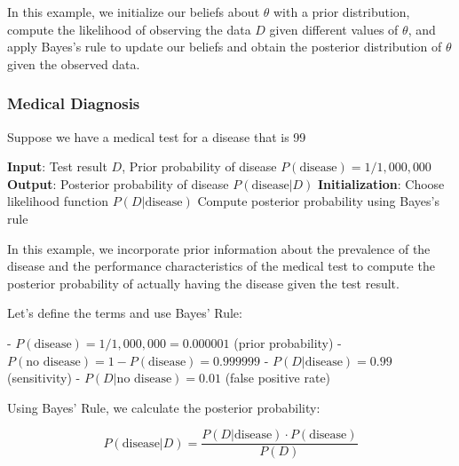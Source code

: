 \documentclass[12pt]{book} %
\begin{document}
In this example, we initialize our beliefs about \(\theta\) with a prior distribution, compute the likelihood of observing the data \(D\) given different values of \(\theta\), and apply Bayes's rule to update our beliefs and obtain the posterior distribution of \(\theta\) given the observed data.

\subsubsection{Medical Diagnosis}

Suppose we have a medical test for a disease that is 99%

\FloatBarrier
\begin{algorithm}
\caption{Bayesian Inference for Medical Diagnosis}
\begin{algorithmic}[1]
\State \textbf{Input}: Test result \(D\), Prior probability of disease \(P(\text{disease}) = 1/1,000,000\)
\State \textbf{Output}: Posterior probability of disease \(P(\text{disease} | D)\)
\State \textbf{Initialization}: Choose likelihood function \(P(D | \text{disease})\)
\State Compute posterior probability using Bayes's rule
\end{algorithmic}
\end{algorithm}
\FloatBarrier

In this example, we incorporate prior information about the prevalence of the disease and the performance characteristics of the medical test to compute the posterior probability of actually having the disease given the test result.

Let's define the terms and use Bayes' Rule:

- \(P(\text{disease}) = 1/1,000,000 = 0.000001\) (prior probability)
- \(P(\text{no disease}) = 1 - P(\text{disease}) = 0.999999\)
- \(P(D | \text{disease}) = 0.99\) (sensitivity)
- \(P(D | \text{no disease}) = 0.01\) (false positive rate)

Using Bayes' Rule, we calculate the posterior probability:

\[ P(\text{disease} | D) = \frac{P(D | \text{disease}) \cdot P(\text{disease})}{P(D)} \]
\end{document}
